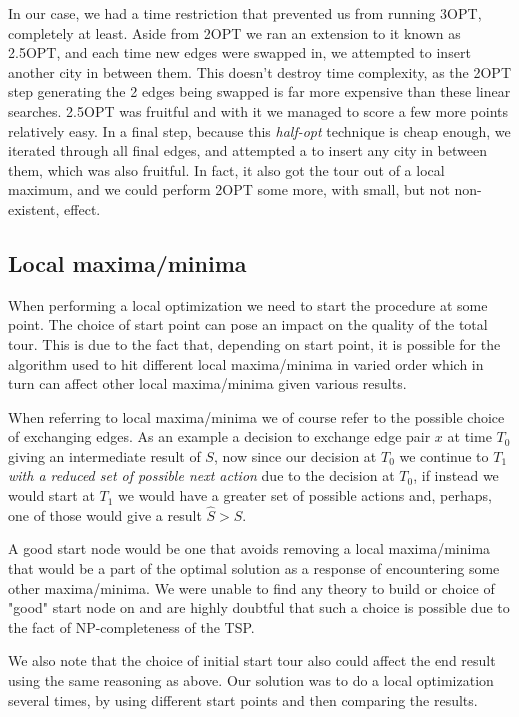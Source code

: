 \documentclass[a4paper,12pt,oneside]{article}
\begin{document}
In our case, we had a time restriction that prevented us from running 3OPT, completely at least. Aside from 2OPT we ran an extension to it known as 2.5OPT, and each time new edges were swapped in, we attempted to insert another city in between them. This doesn't destroy time complexity, as the 2OPT step generating the 2 edges being swapped is far more expensive than these linear searches. 2.5OPT was fruitful and with it we managed to score a few more points relatively easy. In a final step, because this \emph{half-opt} technique is cheap enough, we iterated through all final edges, and attempted a to insert any city in between them, which was also fruitful. In fact, it also got the tour out of a local maximum, and we could perform 2OPT some more, with small, but not non-existent, effect.

\subsection{Local maxima/minima}
When performing a local optimization we need to start the procedure at some point. The choice of start point can pose an impact on the quality of the total tour. This is due to the fact that, depending on start point, it is possible for the algorithm used to hit different local maxima/minima in varied order which in turn can affect other local maxima/minima given various results.

When referring to local maxima/minima we of course refer to the possible choice of exchanging edges. As an example a decision to exchange edge pair $x$ at time $T_0$ giving an intermediate result of $S$, now since our decision at $T_0$ we continue to $T_1$ \textit{with a reduced set of possible next action} due to the decision at $T_0$, if instead we would start at $T_1$ we would have a greater set of possible actions and, perhaps, one of those would give a result $\hat{S} > S$.

A good start node would be one that avoids removing a local maxima/minima that would be a part of the optimal solution as a response of encountering some other maxima/minima. We were unable to find any theory to build or choice of "good" start node on and are highly doubtful that such a choice is possible due to the fact of NP-completeness of the TSP.

We also note that the choice of initial start tour also could affect the end result using the same reasoning as above. Our solution was to do a local optimization several times, by using different start points and then comparing the results.
\end{document}
